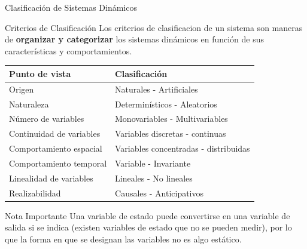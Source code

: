 \documentclass[
    10pt,
    aspectratio=169,
    xcolor={dvipsnames},
    spanish,
    ]{beamer}
\begin{document}
\begin{frame}{Clasificación de Sistemas Dinámicos}
\begin{block}{Criterios de Clasificación}
  Los criterios de clasificacion de un sistema son maneras de \textbf{organizar y categorizar} los sistemas dinámicos en función de sus características y comportamientos.
  \footnotesize
  \begin{table}[h]
    \centering
    \begin{tabular}{|l|l|}
    \hline
    \textbf{Punto de vista} & \textbf{Clasificación} \\
    \hline
    Origen & Naturales - Artificiales \\
    \hline
    Naturaleza & Determinísticos - Aleatorios \\
    \hline
    Número de variables & Monovariables - Multivariables \\
    \hline
    Continuidad de variables & Variables discretas - continuas \\
    \hline
    Comportamiento espacial & Variables concentradas - distribuidas \\
    \hline
    Comportamiento temporal & Variable - Invariante \\
    \hline
    Linealidad de variables & Lineales - No lineales \\
    \hline
    Realizabilidad & Causales - Anticipativos \\
    \hline
    \end{tabular}
  \end{table}
\end{block}

\begin{alertblock}{Nota Importante}
  Una variable de estado puede convertirse en una variable de salida si se indica (existen variables de estado que no se pueden medir), por lo que la forma en que se designan las variables no es algo estático.
\end{alertblock}
\end{frame}
\end{document}
